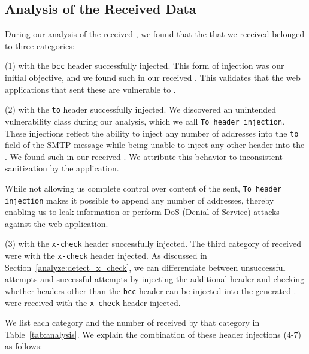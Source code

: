 \vspace{-2.5ex}
\subsection{Analysis of the Received \Email Data}
\vspace{-2.5ex}
During our analysis of the received \emails, we found that the \emails that we received belonged to three categories:

(1) \Emails with the \texttt{bcc} header successfully injected. This form
of injection was our initial objective, and we found
\ehibcc such \emails in our received \emails. This validates that the
web applications that sent these \emails are vulnerable to \ehi.
	
(2) \Emails with the \texttt{to} header successfully injected. We
discovered an unintended vulnerability class during our analysis,
which we call \texttt{To~header injection}. These injections reflect
the ability to inject any number of \email addresses into the
\texttt{to} field of the SMTP message while being unable to inject any
other header into the \emails. We found \ehito such \emails in our
received \emails. We attribute this behavior to inconsistent
sanitization by the application.
   
While not allowing us complete control over content of the \emails
sent, \texttt{To header injection} makes it possible to append any
number of \email addresses, thereby enabling us to leak information or
perform DoS (Denial of Service) attacks against the web application.
	
(3) \Emails with the \texttt{x-check} header successfully injected. The
third category of \emails received were \emails with the
\texttt{x-check} header injected. As discussed in
Section~\ref{analyze:detect_x_check}, we can differentiate between
unsuccessful attempts and successful attempts by injecting the
additional header and checking whether headers other than the
\texttt{bcc} header can be injected into the generated \email.
\ehixcheck \emails were received with the \texttt{x-check} header
injected.

We list each category and the number of \emails received by that
category in Table~\ref{tab:analysis}. We explain the combination of
these header injections (4-7) as follows:

